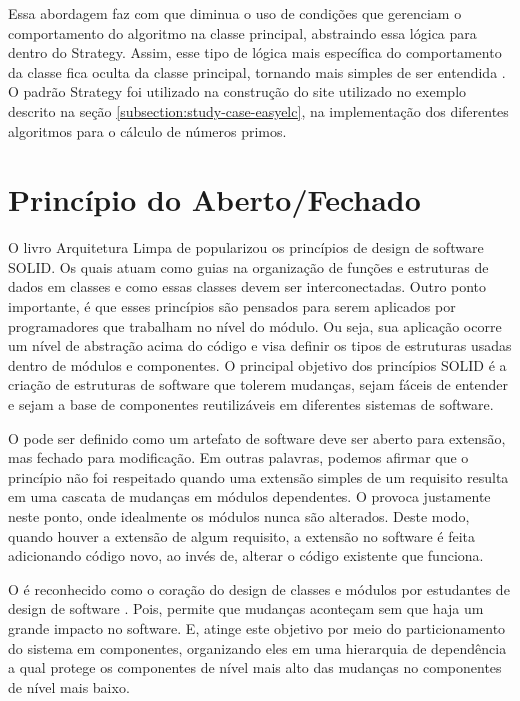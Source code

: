 \documentclass[12pt]{tcc}
\begin{document}
		Essa abordagem faz com que diminua o uso de condições que gerenciam o comportamento do algoritmo na classe principal, abstraindo essa lógica para dentro do Strategy. Assim, esse tipo de lógica mais específica do comportamento da classe fica oculta da classe principal, tornando mais simples de ser entendida  \citep{gamma1994design}. O padrão Strategy foi utilizado na construção do site utilizado no exemplo descrito na seção \ref{subsection:study-case-easyelc}, na implementação dos diferentes algoritmos para o cálculo de números primos.


		\section{Princípio do Aberto/Fechado}
		\label{sec:solid-ocp}
		O livro Arquitetura Limpa de \citet{MartinCleanArchtecture2017} popularizou os princípios de design de software SOLID.
		Os quais atuam como guias na organização de funções e estruturas de dados em classes e como essas classes devem ser interconectadas.
		Outro ponto importante, é que esses princípios são pensados para serem aplicados por programadores que trabalham no nível do módulo.
		Ou seja, sua aplicação ocorre um nível de abstração acima do código e visa definir os tipos de estruturas usadas dentro de módulos e componentes.
		O principal objetivo dos princípios SOLID é a criação de estruturas de software que tolerem mudanças, sejam fáceis de entender e sejam a base de componentes reutilizáveis em diferentes sistemas de software.

		O  pode ser definido como um artefato de software deve ser aberto para extensão, mas fechado para modificação. \citep{Meyer1997ObjectOrientedSoftwareConstruction}
		Em outras palavras, podemos afirmar que o princípio não foi respeitado quando uma extensão simples de um requisito resulta em uma cascata de mudanças em módulos dependentes.
		O  provoca justamente neste ponto, onde idealmente os módulos nunca são alterados.
		Deste modo, quando houver a extensão de algum requisito, a extensão no software é feita adicionando código novo, ao invés de, alterar o código existente que funciona. \citep{Martin2000TheOP}

		O  é reconhecido como o coração do design de classes e módulos por estudantes de design de software \citep{MartinCleanArchtecture2017}.
		Pois, permite que mudanças aconteçam sem que haja um grande impacto no software.
		E, atinge este objetivo por meio do particionamento do sistema em componentes, organizando eles em uma hierarquia de dependência a qual protege os componentes de nível mais alto das mudanças no componentes de nível mais baixo. \citep{MartinCleanArchtecture2017}
\end{document}
